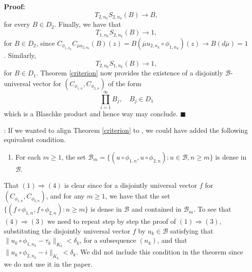 \documentclass[12pt,a4paper]{amsart}
\theoremstyle{plain}
\theoremstyle{definition}
\theoremstyle{remark}
\theoremstyle{fact}
\newenvironment{pf}
{\noindent\textbf{Proof:}}
{\hfill $\blacksquare$\par\medskip}
\newenvironment{rem}
{ \noindent {\it Remark\/}: }
{\null \hfill \par\medskip}
\begin{document}
\begin{pf}
        $$
T_{2, n_k}S_{2, n_k}(B)\rightarrow B,
        $$
        for every $B\in D_2$. Finally, we have that
        $$
T_{1, n_k}S_{2, n_k}(B)\rightarrow 1, 
        $$
        for $B\in D_2$, since $C_{\phi_{1, n_k}}C_{\overline{\mu}u_{2, n_k}}(B)(z)=B(\overline{\mu}u_{2, n_k}\circ \phi_{1, n_k})(z)\rightarrow B(d\overline{\mu})=1$. Similarly,
        $$
T_{2, n_k}S_{1, n_k}(B)\rightarrow 1,
        $$
        for $B\in D_1$. Theorem \ref{criterion} now provides the existence of a disjointly $\mathcal{B}$- universal vector for $(C_{\phi_{1, n}},C_{\phi_{2, n}})$ of the form 
        $$
        \prod_{i=1}^{\infty}B_j, \quad B_j\in D_1
        $$
        which is a Blaschke product and hence way may conclude.
        \end{pf}

    \begin{rem}
        If we wanted to align Theorem \ref{criterion} to \cite[Theorem 2.1]{BGGM09}, we could have added the following equivalent condition.
        \begin{enumerate}
            \item[(4)] For each $m\geq 1$, the set $\mathcal{B}_m=\{(u\circ\phi_{1, n},u\circ \phi_{2, n}): u\in \mathcal{B}, n\geq m\}$ is dense in $\mathcal{B}$.
        \end{enumerate}
        That $(1)\Rightarrow(4)$ is clear since for a disjointly universal vector $f$ for $(C_{\phi_{1, n}},C_{\phi_{2, n}})$, and for any $m\geq 1$, we have that the set $\{(f\circ \phi_{1, n},f\circ \phi_{2, n}): n\geq m\}$ is dense in $\mathcal{B}$ and contained in $\mathcal{B}_m$. To see that $(4)\Rightarrow (3)$ we need to repeat step by step the proof of $(1)\Rightarrow (3)$, substituting the disjointly universal vector $f$ by $u_k \in \mathcal{B}$ satisfying that $\|u_k\circ \phi_{1, n_k}-\tau_k\|_{K_k}<\delta_k$, for a subsequence $(n_k)$, and that $\|u_k\circ \phi_{2, n_k}-i\|_{K_k}<\delta_k$. We did not include this condition in the theorem since we do not use it in the paper.
    \end{rem}

    
\end{document}

